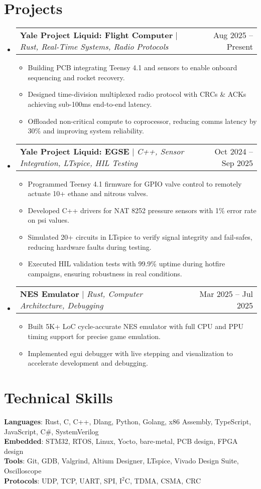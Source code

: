 \documentclass[letterpaper,11pt]{article}
\makeatletter
\newcommand{\resumeItem}[1]{
  \item\small{
    {#1 \vspace{-2pt}}
  }
}
\newcommand{\resumeProjectHeading}[2]{
    \item
    \begin{tabular*}{0.97\textwidth}{l@{\extracolsep{\fill}}r}
      \small#1 & #2 \\
    \end{tabular*}\vspace{-7pt}
}
\newcommand{\resumeSubHeadingListStart}{\begin{itemize}[leftmargin=0.15in, label={}]}
\newcommand{\resumeSubHeadingListEnd}{\end{itemize}}
\newcommand{\resumeItemListStart}{\begin{itemize}}
\newcommand{\resumeItemListEnd}{\end{itemize}\vspace{-5pt}}
\makeatother
\begin{document}
\section{Projects}
    \resumeSubHeadingListStart
        \resumeProjectHeading
          {\textbf{Yale Project Liquid: Flight Computer} $|$ \emph{Rust, Real-Time Systems, Radio Protocols}}{Aug 2025 -- Present}
          \resumeItemListStart
            \resumeItem{Building PCB integrating Teensy 4.1 and sensors to enable onboard sequencing and rocket recovery.}
            \resumeItem{Designed time-division multiplexed radio protocol with CRCs \& ACKs achieving sub-100ms end-to-end latency.}
            \resumeItem{Offloaded non-critical compute to coprocessor, reducing comms latency by 30\% and improving system reliability.}
          \resumeItemListEnd
        \resumeProjectHeading
          {\textbf{Yale Project Liquid: EGSE} $|$ \emph{C++, Sensor Integration, LTspice, HIL Testing}}{Oct 2024 -- Sep 2025}
          \resumeItemListStart
            \resumeItem{Programmed Teensy 4.1 firmware for GPIO valve control to remotely actuate 10+ ethane and nitrous valves.}
            \resumeItem{Developed C++ drivers for NAT 8252 pressure sensors with 1\% error rate on psi values.}
            \resumeItem{Simulated 20+ circuits in LTspice to verify signal integrity and fail-safes, reducing hardware faults during testing.}
            \resumeItem{Executed HIL validation tests with 99.9\% uptime during hotfire campaigns, ensuring robustness in real conditions.}
          \resumeItemListEnd
        \resumeProjectHeading
          {\textbf{NES Emulator} $|$ \emph{Rust, Computer Architecture, Debugging}}{Mar 2025 -- Jul 2025}
          \resumeItemListStart
            \resumeItem{Built 5K+ LoC cycle-accurate NES emulator with full CPU and PPU timing support for precise game emulation.}
            \resumeItem{Implemented egui debugger with live stepping and visualization to accelerate development and debugging.}
          \resumeItemListEnd
    \resumeSubHeadingListEnd

\section{Technical Skills}
 \begin{itemize}[leftmargin=0.15in, label={}]
    \small{\item{
     \textbf{Languages}{: Rust, C, C++, Dlang, Python, Golang, x86 Assembly, TypeScript, JavaScript, C\#, SystemVerilog} \\
     \textbf{Embedded}{: STM32, RTOS, Linux, Yocto, bare-metal, PCB design, FPGA design} \\
     \textbf{Tools}{: Git, GDB, Valgrind, Altium Designer, LTspice, Vivado Design Suite, Oscilloscope} \\
     \textbf{Protocols}{: UDP, TCP, UART, SPI, I$^2$C, TDMA, CSMA, CRC} \\
    }}
 \end{itemize}
\end{document}
